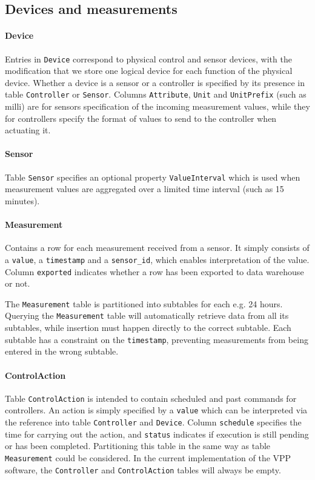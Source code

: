 \subsection{Devices and measurements}

\paragraph{Device} 
Entries in \texttt{Device} correspond to physical control and sensor devices, with the modification that we store one logical device for each function of the physical device. Whether a device is a sensor or a controller is specified by its presence in table \texttt{Controller} or \texttt{Sensor}. Columns \texttt{Attribute}, \texttt{Unit} and \texttt{UnitPrefix} (such as milli) are for sensors specification of the incoming measurement values, while they for controllers specify the format of values to send to the controller when actuating it.

\paragraph{Sensor} 
Table \texttt{Sensor} specifies an optional property \texttt{ValueInterval} which is used when measurement values are aggregated over a limited time interval (such as 15 minutes). 

\paragraph{Measurement} 
Contains a row for each measurement received from a sensor. It simply consists of a \texttt{value}, a \texttt{timestamp} and a \texttt{sensor\_id}, which enables interpretation of the value. Column \texttt{exported} indicates whether a row has been exported to data warehouse or not.

The \texttt{Measurement} table is partitioned into subtables for each e.g. 24 hours. Querying the \texttt{Measurement} table will automatically retrieve data from all its subtables, while insertion must happen directly to the correct subtable. Each subtable has a constraint on the \texttt{timestamp}, preventing measurements from being entered in the wrong subtable.

\paragraph{ControlAction} 
Table \texttt{ControlAction} is intended to contain scheduled and past commands for controllers. An action is simply specified by a \texttt{value} which can be interpreted via the reference into table \texttt{Controller} and \texttt{Device}. Column \texttt{schedule} specifies the time for carrying out the action, and \texttt{status} indicates if execution is still pending or has been completed. Partitioning this table in the same way as table \texttt{Measurement} could be considered. In the current implementation of the VPP software, the \texttt{Controller} and \texttt{ControlAction} tables will always be empty.

